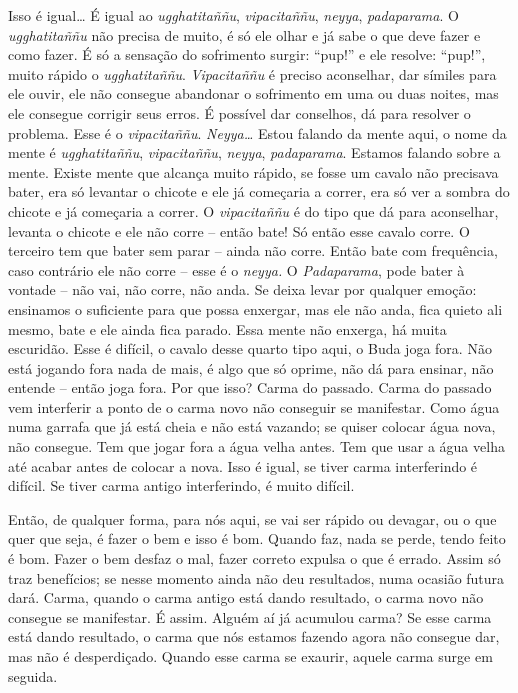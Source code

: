 Isso é igual… É igual ao \textit{ugghatitaññu},
\textit{vipacitaññu}, \textit{neyya}, \textit{padaparama}. O
\textit{ugghatitaññu} não precisa de muito, é só ele olhar e já sabe o
que deve fazer e como fazer. É só a sensação do sofrimento surgir:
“pup!” e ele resolve: “pup!”, muito rápido o \textit{ugghatitaññu}.
\textit{Vipacitaññu} é preciso aconselhar, dar símiles para ele ouvir,
ele não consegue abandonar o sofrimento em uma ou duas noites, mas ele
consegue corrigir seus erros. É possível dar conselhos, dá para
resolver o problema. Esse é o \textit{vipacitaññu}. \textit{Neyya…}
Estou falando da mente aqui, o nome da mente é \textit{ugghatitaññu},
\textit{vipacitaññu}, \textit{neyya}, \textit{padaparama}. Estamos
falando sobre a mente. Existe mente que alcança muito rápido, se fosse
um cavalo não precisava bater, era só levantar o chicote e ele já
começaria a correr, era só ver a sombra do chicote e já começaria a
correr. O \textit{vipacitaññu} é do tipo que dá para aconselhar,
levanta o chicote e ele não corre – então bate! Só então esse cavalo
corre. O terceiro tem que bater sem parar – ainda não corre. Então bate
com frequência, caso contrário ele não corre – esse é o \textit{neyya.}
O \textit{Padaparama}, pode bater à vontade – não vai, não corre, não
anda. Se deixa levar por qualquer emoção: ensinamos o suficiente para
que possa enxergar, mas ele não anda, fica quieto ali mesmo, bate e ele
ainda fica parado. Essa mente não enxerga, há muita escuridão. Esse é
difícil, o cavalo desse quarto tipo aqui, o Buda joga fora. Não está
jogando fora nada de mais, é algo que só oprime, não dá para ensinar,
não entende – então joga fora. Por que isso? Carma do passado. Carma do
passado vem interferir a ponto de o carma novo não conseguir se
manifestar. Como água numa garrafa que já está cheia e não está
vazando; se quiser colocar água nova, não consegue. Tem que jogar fora
a água velha antes. Tem que usar a água velha até acabar antes de
colocar a nova. Isso é igual, se tiver carma interferindo é difícil. Se
tiver carma antigo interferindo, é muito difícil. 

Então, de qualquer forma, para nós aqui, se vai ser rápido ou
devagar, ou o que quer que seja, é fazer o bem e isso é bom. Quando
faz, nada se perde, tendo feito é bom. Fazer o bem desfaz o mal, fazer
correto expulsa o que é errado. Assim só traz benefícios; se nesse
momento ainda não deu resultados, numa ocasião futura dará. Carma,
quando o carma antigo está dando resultado, o carma novo não consegue
se manifestar. É assim. Alguém aí já acumulou carma? Se esse carma está
dando resultado, o carma que nós estamos fazendo agora não consegue
dar, mas não é desperdiçado. Quando esse carma se exaurir, aquele carma
surge em seguida.

